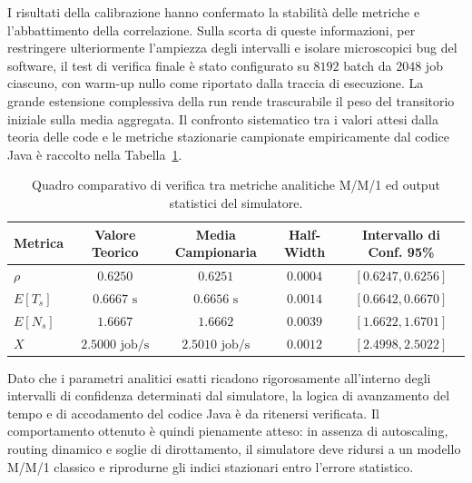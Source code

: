 ﻿\documentclass[a4paper,12pt]{article}
\begin{document}
I risultati della calibrazione hanno confermato la stabilità delle metriche e l'abbattimento della correlazione. Sulla scorta di queste informazioni, per restringere ulteriormente l'ampiezza degli intervalli e isolare microscopici bug del software, il test di verifica finale è stato configurato su $8192$ batch da $2048$ job ciascuno, con warm-up nullo come riportato dalla traccia di esecuzione. La grande estensione complessiva della run rende trascurabile il peso del transitorio iniziale sulla media aggregata. Il confronto sistematico tra i valori attesi dalla teoria delle code e le metriche stazionarie campionate empiricamente dal codice Java è raccolto nella Tabella~\ref{tab:mm1_verification}.

\begin{table}[htbp]
    \centering
    \small
    \renewcommand{\arraystretch}{1.3}
    \begin{tabular}{lcccc}
        \hline
        \textbf{Metrica} & \textbf{Valore Teorico} & \textbf{Media Campionaria} & \textbf{Half-Width} & \textbf{Intervallo di Conf. 95\%}   \\ \hline
        $\rho$      & $0.6250$                & $0.6251$                               & $0.0004$                   & $[0.6247, 0.6256]$        \\
        $E[T_s]$    & $0.6667\text{ s}$       & $0.6656\text{ s}$                      & $0.0014$                   & $[0.6642, 0.6670]$        \\
        $E[N_s]$    & $1.6667$                & $1.6662$                               & $0.0039$                   & $[1.6622, 1.6701]$        \\
        $X$         & $2.5000\text{ job/s}$   & $2.5010\text{ job/s}$                  & $0.0012$                   & $[2.4998, 2.5022]$        \\ \hline
    \end{tabular}
    \caption{Quadro comparativo di verifica tra metriche analitiche M/M/1 ed output statistici del simulatore.}
    \label{tab:mm1_verification}
\end{table}

Dato che i parametri analitici esatti ricadono rigorosamente all'interno degli intervalli di confidenza determinati dal simulatore, la logica di avanzamento del tempo e di accodamento del codice Java è da ritenersi verificata. Il comportamento ottenuto è quindi pienamente atteso: in assenza di autoscaling, routing dinamico e soglie di dirottamento, il simulatore deve ridursi a un modello M/M/1 classico e riprodurne gli indici stazionari entro l'errore statistico.
\end{document}
